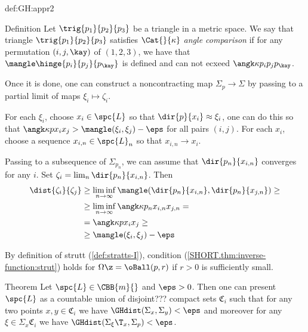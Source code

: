 {\begin{subthm}{def:GH:appr2}
\begin{thm}{Definition}
Let $\trig{p_1}{p_2}{p_3}$ be a triangle in a metric space.
We say that triangle $\trig{p_1}{p_2}{p_3}$ satisfies \emph{$\Cat{}{\kappa}$ angle comparison} if for any permutation $(i,j,\kay)$ of $(1,2,3)$, we have that $\mangle\hinge{p_i}{p_j}{p_\kay}$ is defined and can not ecxeed $ \angk\kappa{p_i}{p_j}{p_\kay}$.
\end{thm}






Once it is done, one can construct a noncontracting map $\Sigma_p\to \Sigma$ by passing to a partial limit of maps $\xi_i\mapsto \zeta_i$.

For each $\xi_i$, choose $x_i\in \spc{L}$ so that $\dir{p}{x_i}\approx \xi_i$, one can do this so that
$\angk\kappa p{x_i}{x_j}>\mangle(\xi_i,\xi_j)-\eps$ for all pairs $(i,j)$.
For each $x_i$, choose a sequence $x_{i,n}\in \spc{L}_n$ so that $x_{i,n}\to x_i$.

Passing to a subsequence of $\Sigma_{p_n}$, we can assume that $\dir{p_n}{x_{i,n}}$ converges for any $i$.
Set $\zeta_i=\lim_n\dir{p_n}{x_{i,n}}$.
Then 
\begin{align*}
\dist{\zeta_i}{\zeta_j}
&\ge 
\liminf_{n\to\infty}\mangle(\dir{p_n}{x_{i,n}},\dir{p_n}{x_{j,n}})
\ge
\\
&\ge 
\liminf_{n\to\infty}\angk\kappa {p_n}{x_{i,n}}{x_{j,n}}
=
\\
&=
\angk\kappa p{x_i}{x_j}
\ge 
\\
&\ge
\mangle(\xi_i,\xi_j)-\eps
\end{align*}
\qedsf




By definition of strutt (\ref{def:stratts-I}), condition (\ref{SHORT.thm:inverse-function:strut}) holds for $\Omega\z=\oBall(p,r)$ if $r>0$ is sufficiently small.













\begin{thm}{Theorem}
Let $\spc{L}\in\CBB{m}{}$ and $\eps>0$.
Then one can present $\spc{L}$ as a countable union of disjoint??? compact sets $\mathfrak C_i$
such that for any two points $x,y\in \mathfrak C_i$ we have $\GHdist(\Sigma_x,\Sigma_y)<\eps$ and moreover for any $\xi\in\Sigma_x\mathfrak C_i$ we have $\GHdist(\Sigma_\xi\T_x,\Sigma_p)<\eps$.
\end{thm}














\end{subthm}}
